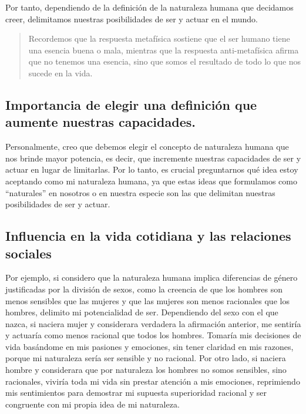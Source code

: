 \documentclass[
  jou,
  floatsintext,
  longtable,
  a4paper,
  nolmodern,
  notxfonts,
  notimes,
  12pt,
  colorlinks=true,linkcolor=blue,citecolor=blue,urlcolor=blue]{apa7}
\begin{document}
Por tanto, dependiendo de la definición de la naturaleza humana que
decidamos creer, delimitamos nuestras posibilidades de ser y actuar en
el mundo.

\begin{quote}
Recordemos que la respuesta metafísica sostiene que el ser humano tiene
una esencia buena o mala, mientras que la respuesta anti-metafísica
afirma que no tenemos una esencia, sino que somos el resultado de todo
lo que nos sucede en la vida.
\end{quote}

\subsection{Importancia de elegir una definición que aumente nuestras
capacidades.}\label{importancia-de-elegir-una-definiciuxf3n-que-aumente-nuestras-capacidades.}

Personalmente, creo que debemos elegir el concepto de naturaleza humana
que nos brinde mayor potencia, es decir, que incremente nuestras
capacidades de ser y actuar en lugar de limitarlas. Por lo tanto, es
crucial preguntarnos qué idea estoy aceptando como mi naturaleza humana,
ya que estas ideas que formulamos como ``naturales'' en nosotros o en
nuestra especie son las que delimitan nuestras posibilidades de ser y
actuar.

\subsection{Influencia en la vida cotidiana y las relaciones
sociales}\label{influencia-en-la-vida-cotidiana-y-las-relaciones-sociales}

Por ejemplo, si considero que la naturaleza humana implica diferencias
de género justificadas por la división de sexos, como la creencia de que
los hombres son menos sensibles que las mujeres y que las mujeres son
menos racionales que los hombres, delimito mi potencialidad de ser.
Dependiendo del sexo con el que nazca, si naciera mujer y considerara
verdadera la afirmación anterior, me sentiría y actuaría como menos
racional que todos los hombres. Tomaría mis decisiones de vida basándome
en mis pasiones y emociones, sin tener claridad en mis razones, porque
mi naturaleza sería ser sensible y no racional. Por otro lado, si
naciera hombre y considerara que por naturaleza los hombres no somos
sensibles, sino racionales, viviría toda mi vida sin prestar atención a
mis emociones, reprimiendo mis sentimientos para demostrar mi supuesta
superioridad racional y ser congruente con mi propia idea de mi
naturaleza.
\end{document}
